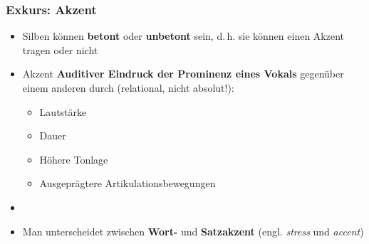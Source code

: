 \begin{frame}
\frametitle{Exkurs: Akzent}

\begin{itemize}
	\item Silben können \textbf{betont} oder \textbf{unbetont} sein, d.\,h. sie können einen Akzent tragen oder nicht
	\item[]

\begin{block}{Akzent}
\textbf{Auditiver Eindruck der Prominenz eines Vokals} gegenüber einem anderen durch (relational, nicht absolut!):
\begin{itemize}
	\item Lautstärke
	\item Dauer
	\item Höhere Tonlage
	\item Ausgeprägtere Artikulationsbewegungen
\end{itemize}
\end{block}	 
	
	\item[]
	\item Man unterscheidet zwischen \textbf{Wort-} und \textbf{Satzakzent} (engl. \emph{stress} und \emph{accent})

\end{itemize}

\end{frame}




